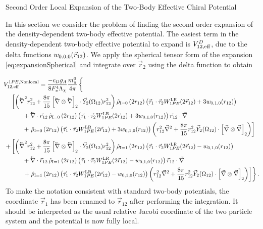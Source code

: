\begin{section}{Second Order Local Expansion of the Two-Body Effective Chiral Potential\label{sec:localChiral}}

In this section we consider the problem of finding the second order expansion of the density-dependent two-body effective potential. The easiest term in the density-dependent two-body effective potential to expand is $V_{12,\text{eff}}^D$, due to the delta functions $w_{0,0,0}(\vec{r}_{12})$. We apply the spherical tensor form of the expansion \eqref{eq:expansionSpherical} and integrate over $\vec{r}_2$ using the delta function to obtain

\begin{align}
&\hspace{-.4cm}V^{1PE,\text{Nonlocal}}_{12,\text{eff}}= \frac{-c_D g_A}{8F_\pi^4 \Lambda_\chi}\frac{m_\pi^6}{4\pi} \left\{\phantom{\frac{-c_D g_Am_\pi^6}{8 F_\pi^4 \Lambda_\chi}}\right.\\
&\left[\left(\lvec{\nabla}^2r_{12}^2+\frac{8\pi}{15}\left[\lvec{\nabla}\otimes \lvec{\nabla}\right]_2\cdot \vec{Y}_2(\Omega_{12})r_{12}^2 \right) \rhohat{0}{2 r_{12}}\left(\taudot W^{\text{LR}}_{1PE}(2\rot)+3\w{0}{1}{0}{r_{12}} \right)\right. \\
%
&\hspace{.7cm}+\lvec{\nabla}\cdot\vec{r}_{12} \,\rhohat{0}{2 r_{12}} \left(\taudot W^{\text{LR}}_{1PE}(2\rot)+3\w{0}{1}{0}{r_{12}} \right)\vec{r}_{12}\cdot\vec{\nabla} \\
%
&\hspace{.7cm}+\left.\rhohat{0}{2 r_{12}} \left(\taudot W^{\text{LR}}_{1PE}(2\rot)+3\w{0}{1}{0}{r_{12}} \right)\left(r_{12}^2 \vec{\nabla}^2+\frac{8\pi}{15}r_{12}^2\vec{Y}_2(\Omega_{12})\cdot\left[\vec{\nabla}\otimes \vec{\nabla}\right]_2 \right)\right] \\
%
%
+&\left[\left(\lvec{\nabla}^2r_{12}^2+\frac{8\pi}{15}\left[\lvec{\nabla}\otimes \lvec{\nabla}\right]_2\cdot \vec{Y}_2(\Omega_{12})r_{12}^2 \right) \rhohat{1}{2 r_{12}} \left(\taudot W^{\text{LR}}_{1PE}(2\rot)-\w{0}{1}{0}{r_{12}} \right)\right. \\
%
&\hspace{.7cm}+\lvec{\nabla}\cdot\vec{r}_{12}\, \rhohat{1}{2 r_{12}} \left(\taudot W^{\text{LR}}_{1PE}(2\rot)-\w{0}{1}{0}{r_{12}} \right)\vec{r}_{12}\cdot\vec{\nabla} \\
%
&\left.\hspace{.7cm}+\left.\rhohat{1}{2 r_{12}}\left(\taudot W^{\text{LR}}_{1PE}(2\rot)-\w{0}{1}{0}{r_{12}} \right)\left(r_{12}^2 \vec{\nabla}^2+\frac{8\pi}{15}r_{12}^2\vec{Y}_2(\Omega_{12})\cdot\left[\vec{\nabla}\otimes \vec{\nabla}\right]_2 \right)\right]\right\}.
\end{align}
To make the notation consistent with standard two-body potentials, the coordinate $\vec{r}_1$ has been renamed to $\vec{r}_{12}$ after performing the integration. It should be interpreted as the usual relative Jacobi coordinate of the two particle system and the potential is now fully local.


\end{section}
